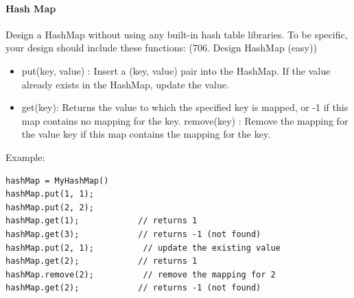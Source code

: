 \documentclass[../main.tex]{subfiles}
\begin{document}
\paragraph{Hash Map} Design a HashMap without using any built-in hash table libraries. To be specific, your design should include these functions: (706. Design HashMap (easy))
\begin{itemize}
    \item put(key, value) : Insert a (key, value) pair into the HashMap. If the value already exists in the HashMap, update the value.
    \item get(key): Returns the value to which the specified key is mapped, or -1 if this map contains no mapping for the key.
    remove(key) : Remove the mapping for the value key if this map contains the mapping for the key.
\end{itemize}
Example:
\begin{lstlisting}[numbers=none]
hashMap = MyHashMap()
hashMap.put(1, 1);          
hashMap.put(2, 2);         
hashMap.get(1);            // returns 1
hashMap.get(3);            // returns -1 (not found)
hashMap.put(2, 1);          // update the existing value
hashMap.get(2);            // returns 1 
hashMap.remove(2);          // remove the mapping for 2
hashMap.get(2);            // returns -1 (not found) 
\end{lstlisting}
\end{document}
